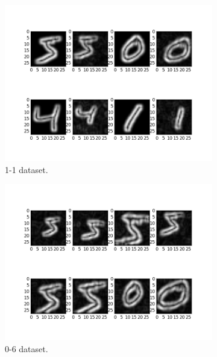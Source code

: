 \begin{figure}
\begin{subfigure}{0.5\textwidth}
		\includegraphics[width=1\linewidth]{figures/1-1.png}
		\caption{1-1 dataset.}\label{fig:1-1}
	\end{subfigure}%
	\begin{subfigure}{0.5\textwidth}
		\centering
		\includegraphics[width=1\linewidth]{figures/0-6.png}
		\caption{0-6 dataset.}\label{fig:0-6}
	\end{subfigure}
	\begin{subfigure}{0.5\textwidth}
		\centering

\end{subfigure}
\end{figure}
